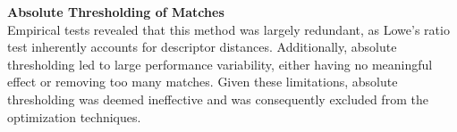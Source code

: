 \textbf{Absolute Thresholding of Matches} \\
 Empirical tests revealed that this method was largely redundant, as Lowe's ratio test inherently accounts for descriptor distances. Additionally, absolute thresholding led to large performance variability, either having no meaningful effect or removing too many matches. Given these limitations, absolute thresholding was deemed ineffective and was consequently excluded from the optimization techniques.

